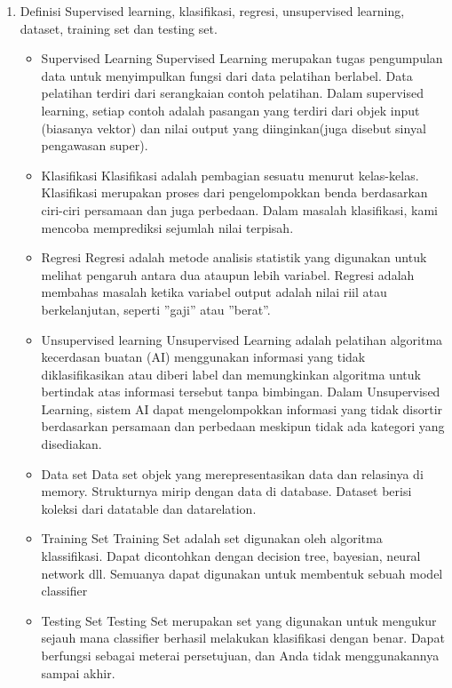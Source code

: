 \begin{enumerate}
   
	\item Definisi Supervised learning, klasifikasi, regresi, unsupervised learning, dataset, training set dan testing set.
	\hfill\break
	\begin{itemize}
		\item Supervised Learning
		\hfill\break
		Supervised Learning merupakan tugas pengumpulan data untuk menyimpulkan fungsi dari data pelatihan berlabel. Data pelatihan terdiri dari serangkaian contoh pelatihan. Dalam supervised learning, setiap contoh adalah pasangan yang terdiri dari objek input (biasanya vektor) dan nilai output yang diinginkan(juga disebut sinyal pengawasan super).
		\item Klasifikasi
		\hfill\break
		Klasifikasi adalah pembagian sesuatu menurut kelas-kelas.  Klasifikasi merupakan proses dari pengelompokkan benda berdasarkan ciri-ciri persamaan dan juga perbedaan. Dalam masalah klasifikasi, kami mencoba memprediksi sejumlah nilai terpisah.
		\item Regresi
		\hfill\break
		Regresi adalah metode analisis statistik yang digunakan untuk melihat pengaruh antara dua ataupun lebih variabel. Regresi adalah membahas masalah ketika variabel output adalah nilai riil atau berkelanjutan, seperti ”gaji” atau ”berat”.
		\item Unsupervised learning 
		\hfill\break
		Unsupervised Learning adalah pelatihan algoritma kecerdasan buatan (AI) menggunakan informasi yang tidak diklasifikasikan atau diberi label dan memungkinkan algoritma untuk bertindak atas informasi tersebut tanpa bimbingan. Dalam Unsupervised Learning, sistem AI dapat mengelompokkan informasi yang tidak disortir berdasarkan persamaan dan perbedaan meskipun tidak ada kategori yang disediakan.
		\item Data set
		\hfill\break
		Data set objek yang merepresentasikan data dan relasinya di memory. Strukturnya mirip dengan data di database. Dataset berisi koleksi dari datatable dan datarelation.
		\item Training Set
		\hfill\break
		Training Set adalah set digunakan oleh algoritma klassifikasi. Dapat dicontohkan dengan decision tree, bayesian, neural network dll. Semuanya dapat digunakan untuk membentuk sebuah model classifier
		\item Testing Set
		\hfill\break
		Testing Set merupakan set yang digunakan untuk mengukur sejauh mana classifier berhasil melakukan klasifikasi dengan benar. Dapat berfungsi sebagai meterai persetujuan, dan Anda tidak menggunakannya sampai akhir.
	\end{itemize}
\end{enumerate}
